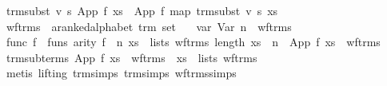 \begin{isabellebody}
{}\ {}trm{}subst\ v\ s\ {}App\ f\ xs{}\ {}\ App\ f\ {}map\ {}trm{}subst\ v\ s{}\ xs{}{}\isanewline
\isanewline
{}\isamarkupfalse%
\ wf{}trms\ {}{}\ {}{}a{}{}ranked{}alphabet\ trm\ set{}\ \isanewline
\ \ var{}\ {}Var\ n\ {}\ wf{}trms{}\isanewline
{}\ func{}\ {}{}f\ {}\ funs{}\ arity\ f\ {}\ n{}\ xs\ {}\ lists\ wf{}trms{}\ length\ xs\ {}\ n{}\ {}\ App\ f\ xs\ {}\ wf{}trms{}\isanewline
\isanewline
{}\isamarkupfalse%
\ trm{}subterms{}\ {}App\ f\ xs\ {}\ wf{}trms\ {}\ xs\ {}\ lists\ wf{}trms{}\isanewline
%
\isadelimproof
\ \ %
\endisadelimproof
%
\isatagproof
{}\isamarkupfalse%
\ {}metis\ {}lifting{}\ trm{}simps{}{}{}\ trm{}simps{}{}{}\ wf{}trms{}simps{}%

\end{isabellebody}
